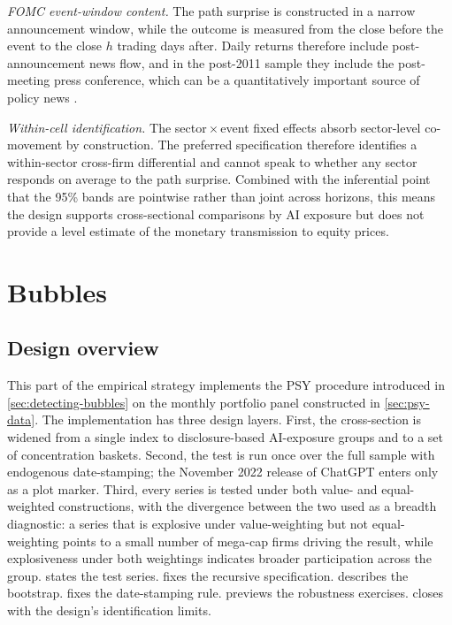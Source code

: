 \textit{FOMC event-window content.} The path surprise is constructed in a narrow announcement window, while the outcome is measured from the close before the event to the close $h$ trading days after. Daily returns therefore include post-announcement news flow, and in the post-2011 sample they include the post-meeting press conference, which can be a quantitatively important source of policy news \citep{gurkaynakKarasoyCanLee2022, durante2022, acostaEtAl2025}.

\textit{Within-cell identification.} The sector\,$\times$\,event fixed effects absorb sector-level co-movement by construction. The preferred specification therefore identifies a within-sector cross-firm differential and cannot speak to whether any sector responds on average to the path surprise. Combined with the inferential point that the 95\% bands are pointwise rather than joint across horizons, this means the design supports cross-sectional comparisons by AI exposure but does not provide a level estimate of the monetary transmission to equity prices.

\section{Bubbles}

 
\subsection{Design overview}
\label{subsec:bubble-overview}
 
This part of the empirical strategy implements the PSY procedure
introduced in \cref{sec:detecting-bubbles} on the monthly portfolio
panel constructed in \cref{sec:psy-data}. The implementation has
three design layers. First, the cross-section is widened from a single
index to disclosure-based AI-exposure groups and to a set of
concentration baskets. Second, the test is run once over the full
sample with endogenous date-stamping; the November 2022 release of
ChatGPT enters only as a plot marker. Third, every series is tested
under both value- and equal-weighted constructions, with the divergence
between the two used as a breadth diagnostic: a series that is
explosive under value-weighting but not equal-weighting points to a
small number of mega-cap firms driving the result, while explosiveness
under both weightings indicates broader participation across the group.
 states the test series.
 fixes the recursive specification.
 describes the bootstrap.
 fixes the date-stamping rule.
 previews the robustness
exercises.  closes with the
design's identification limits.
 
